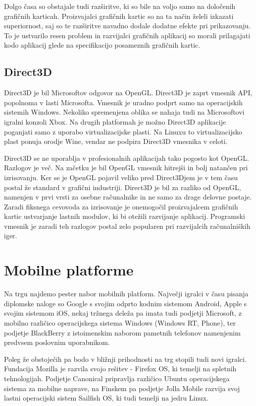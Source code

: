 Dolgo časa so obstajale tudi razširitve, ki so bile na voljo samo na določenih grafičnih karticah. Proizvajalci grafičnih kartic so na ta način želeli izkazati superiornost, saj so te razširitve navadno dodale dodatne efekte pri prikazovanju. To je ustvarilo resen problem in razvijalci grafičnih aplikacij so morali prilagajati kodo aplikacij glede na specifikacijo posameznih grafičnih kartic.

\subsection{Direct3D}

Direct3D \cite{direct3d} je bil Microsoftov odgovor na OpenGL. Direct3D je zaprt vmesnik API, popolnoma v lasti Microsofta. Vmesnik je uradno podprt samo na operacijskih sistemih Windows. Nekoliko spremenjena oblika se nahaja tudi na Microsoftovi igralni konzoli Xbox. Na drugih platformah je možno Direct3D aplikacije poganjati samo z uporabo virtualizacijske plasti. Na Linuxu to virtualizacijsko plast ponuja orodje Wine, vendar ne podpira Direct3D vmesnika v celoti.

Direct3D se ne uporablja v profesionalnih aplikacijah tako pogosto kot OpenGL. Razlogov je več. Na začetku je bil OpenGL vmesnik hitrejši in bolj natančen pri izrisovanju. Ker se je OpenGL pojavil veliko pred Direct3Djem je v tem času postal že standard v grafični industriji. Direct3D je bil za razliko od OpenGL, namenjen v prvi vrsti za osebne računalnike in ne samo za drage delovne postaje. Zaradi fiksnega cevovoda za izrisovanje je onemogočil proizvajalcem grafičnih kartic ustvarjanje lastnih modulov, ki bi otežili razvijanje aplikacij. Programski vmesnik je zaradi teh razlogov postal zelo popularen pri razvijalcih računalniških iger.

\section{Mobilne platforme} 

Na trgu najdemo pester nabor mobilnih platform. Največji igralci v času pisanja diplomske naloge so Google s svojim odprto kodnim sistemom Android, Apple s svojim sistemom iOS, nekaj tržnega deleža pa imata tudi podjetji Microsoft, z mobilno različico operacijskega sistema Windows (Windows RT, Phone), ter podjetje BlackBerry z istoimenskim naborom pametnih telefonov namenjenim predvsem poslovnim uporabnikom.

Poleg že obstoječih pa bodo v bližnji prihodnosti na trg stopili tudi novi igralci. Fundacija Mozilla je razvila svojo rešitev - Firefox OS, ki temelji na spletnih tehnologijah. Podjetje Canonical pripravlja različico Ubuntu operacijskega sistema za  mobilne naprave, na Finskem pa podjetje Jolla Mobile razvija svoj lastni operacijski sistem Sailfish OS, ki tudi temelji na jedru Linux.

